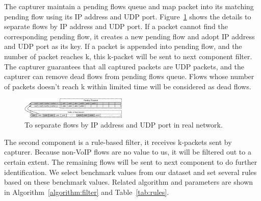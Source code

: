 \documentclass[conference]{IEEEtran}
\begin{document}
The capturer maintain a pending flows queue and map packet into its matching pending flow using its IP address and UDP port. Figure~\ref{fig:flow} shows the details to separate flows by IP address and UDP port. If a packet cannot find the corresponding pending flow, it creates a new pending flow and adopt IP address and UDP port as its key. If a packet is appended into pending flow, and the number of packet reaches k, this k-packet will be sent to next component filter. The capturer guarantees that all captured packets are UDP packets, and the capturer can remove dead flows from pending flows queue. Flows whose number of packets doesn't reach k within limited time will be considered as dead flows.

\begin{figure}[htp]
\begin{center}
\includegraphics[width=0.45\textwidth]{flow.eps}
\caption{To separate flows by IP address and UDP port in real network.}\label{fig:flow}
\end{center}
\end{figure}

The second component is a rule-based filter, it receives k-packets sent by capturer. Because non-VoIP flows are no value to us, it will be filtered out to a certain extent. The remaining flows will be sent to next component to do further identification. We select benchmark values from our dataset and set several rules based on these benchmark values. Related algorithm and parameters are shown in Algorithm~\ref{algorithm:filter} and Table~\ref{tab:rules}.
\end{document}
